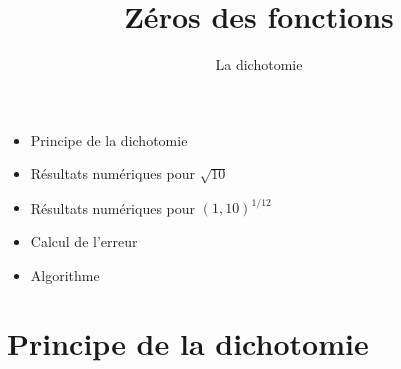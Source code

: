 




\newcommand{\Python}{\texttt{Python}}
\renewcommand{\evidence}[1]{{\color{blue}\textbf{#1}}}

\usepackage{textcomp}

\usepackage{listings}


\newcommand{\codeinline}[1]{\lstinline!#1!}







\title{{\bf Zéros des fonctions}}
\subtitle{La dichotomie}

\begin{frame}
  
  \debutmontitre

  \pause

{\footnotesize
\hfill
{}
\begin{minipage}{0.6\textwidth}
  \begin{itemize}
    \item<3-> Principe de la dichotomie
    \item<4-> Résultats numériques pour $\sqrt{10}$
    \item<5-> Résultats numériques pour $(1,10)^{1/12}$
    \item<6-> Calcul de l'erreur
    \item<7-> Algorithme   
  \end{itemize}
\end{minipage}
}

\end{frame}

\setcounter{framenumber}{0}




\section{Principe de la dichotomie}

